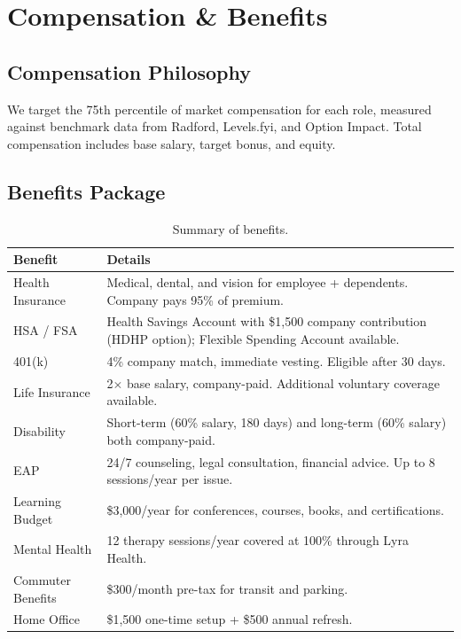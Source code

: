 \documentclass[
    language=english,
    doctype=employee-handbook,
    institution=none,
]{../../omnilatex}
\begin{document}
\section{Compensation \& Benefits}

\subsection{Compensation Philosophy}

We target the 75th percentile of market compensation for each role, measured
against benchmark data from Radford, Levels.fyi, and Option Impact. Total
compensation includes base salary, target bonus, and equity.

\subsection{Benefits Package}

\begin{table}[h]
    \centering
    \begin{tabular}{lp{7cm}}
        \toprule
        \textbf{Benefit} & \textbf{Details} \\
        \midrule
        Health Insurance    & Medical, dental, and vision for employee + dependents. Company pays 95\% of premium. \\
        HSA / FSA           & Health Savings Account with \$1,500 company contribution (HDHP option); Flexible Spending Account available. \\
        401(k)              & 4\% company match, immediate vesting. Eligible after 30 days. \\
        Life Insurance      & 2$\times$ base salary, company-paid. Additional voluntary coverage available. \\
        Disability          & Short-term (60\% salary, 180 days) and long-term (60\% salary) both company-paid. \\
        EAP                 & 24/7 counseling, legal consultation, financial advice. Up to 8 sessions/year per issue. \\
        Learning Budget     & \$3,000/year for conferences, courses, books, and certifications. \\
        Mental Health       & 12 therapy sessions/year covered at 100\% through Lyra Health. \\
        Commuter Benefits   & \$300/month pre-tax for transit and parking. \\
        Home Office         & \$1,500 one-time setup + \$500 annual refresh. \\
        \bottomrule
    \end{tabular}
    \caption{Summary of benefits.}
\end{table}
\end{document}
